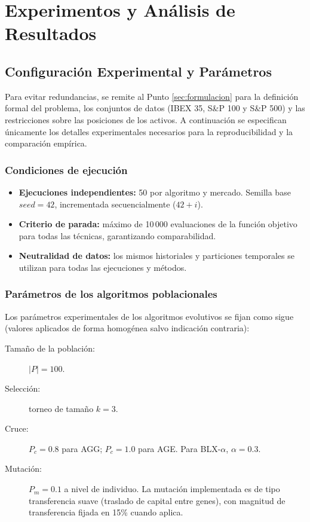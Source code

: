 \newpage
\section{Experimentos y Análisis de Resultados}
\label{sec:experimentos}

\subsection{Configuración Experimental y Parámetros}

Para evitar redundancias, se remite al Punto \ref{sec:formulacion} para la definición formal del problema, los conjuntos de datos (IBEX 35, S\&P 100 y S\&P 500) y las restricciones sobre las posiciones de los activos. A continuación se especifican únicamente los detalles experimentales necesarios para la reproducibilidad y la comparación empírica.

\subsubsection*{Condiciones de ejecución}

\begin{itemize}
    \item \textbf{Ejecuciones independientes:} 50 por algoritmo y mercado. Semilla base $seed=42$, incrementada secuencialmente ($42+i$).
    \item \textbf{Criterio de parada:} máximo de 10\,000 evaluaciones de la función objetivo para todas las técnicas, garantizando comparabilidad.
    \item \textbf{Neutralidad de datos:} los mismos historiales y particiones temporales se utilizan para todas las ejecuciones y métodos.
\end{itemize}

\subsubsection*{Parámetros de los algoritmos poblacionales}

Los parámetros experimentales de los algoritmos evolutivos se fijan como sigue (valores aplicados de forma homogénea salvo indicación contraria):

\begin{description}
    \item[Tamaño de la población:] $|P| = 100$.
    \item[Selección:] torneo de tamaño $k=3$.
    \item[Cruce:] $P_c = 0.8$ para AGG; $P_c = 1.0$ para AGE. Para BLX-$\alpha$, $\alpha = 0.3$.
    \item[Mutación:] $P_m = 0.1$ a nivel de individuo. La mutación implementada es de tipo transferencia suave (traslado de capital entre genes), con magnitud de transferencia fijada en 15\% cuando aplica.
\end{description}

